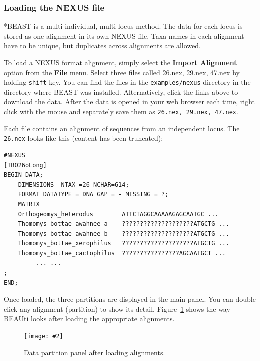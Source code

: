 \documentclass{article}
\newcommand{\includeimage}[2][]{%
\texttt{[image: \#2]}
}
\begin{document}
\def\mlstname{*BEAST}

\subsubsection{Loading the NEXUS file}

\mlstname{} is a multi-individual, multi-locus method. The data for each
locus is stored as one alignment in its own NEXUS file. Taxa names in each
alignment have to be unique, but duplicates across alignments are allowed.

To load a NEXUS format alignment, simply select the {\bf Import
Alignment} option from the {\bf File} menu. Select three files called \href{https://github.com/CompEvol/beast2/blob/master/examples/nexus/26.nex?raw=true}{26.nex}, \href{https://github.com/CompEvol/beast2/blob/master/examples/nexus/29.nex?raw=true}{29.nex}, \href{https://github.com/CompEvol/beast2/blob/master/examples/nexus/47.nex?raw=true}{47.nex} by holding \texttt{shift} key. 
You can find the files in the {\tt examples/nexus} directory in the directory where BEAST was installed. 
Alternatively, click the links above to download the data. After the data is opened in your web browser each time, right click with the mouse and separately save them as \texttt{26.nex, 29.nex, 47.nex}.

Each file contains an alignment of sequences from an independent locus. The \texttt{26.nex} looks like this (content has been truncated):

\begin{verbatim}
#NEXUS
[TBO26oLong]
BEGIN DATA;
	DIMENSIONS  NTAX =26 NCHAR=614;
	FORMAT DATATYPE = DNA GAP = - MISSING = ?;
	MATRIX	
	Orthogeomys_heterodus        ATTCTAGGCAAAAAGAGCAATGC ...
	Thomomys_bottae_awahnee_a    ????????????????????ATGCTG ...
	Thomomys_bottae_awahnee_b    ????????????????????ATGCTG ...
	Thomomys_bottae_xerophilus   ????????????????????ATGCTG ...
	Thomomys_bottae_cactophilus  ????????????????AGCAATGCT ...
         ... ...
;
END;
\end{verbatim}

Once loaded, the three partitions are displayed in the main panel.
You can double click any alignment (partition) to show its detail.
Figure~\ref{fig.datapartition} shows the way BEAUti looks after loading the appropriate alignments.

\begin{figure}[h]
\centering
\includeimage[scale=0.33,clip=true,trim=0 600 0 0]{figures/BEAUti_DataPartitions}
\caption{\label{fig.datapartition} Data partition panel after loading alignments.}
\end{figure}
\end{document}
